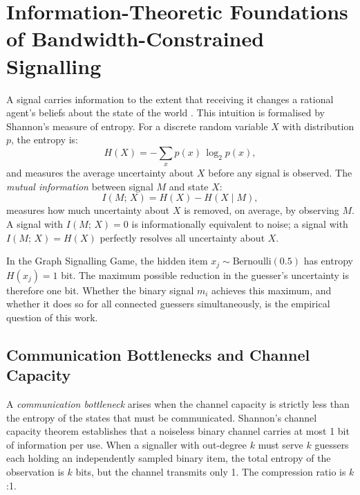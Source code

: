 \documentclass[a4paper,twoside,12pt]{report}
\begin{document}
    \section*{Information-Theoretic Foundations of Bandwidth-Constrained Signalling}
    \label{sec:signalling-theory}
    
    A signal carries information to the extent that receiving it changes a
    rational agent's beliefs about the state of the world
    \citep{skyrms2010}. This intuition is formalised by Shannon's measure of
    entropy. For a discrete random variable $X$ with distribution $p$, the
    entropy is:
    \begin{equation}
        H(X) = -\sum_{x} p(x)\,\log_2 p(x),
    \end{equation}
    and measures the average uncertainty about $X$ before any signal is
    observed. The \emph{mutual information} between signal $M$ and state $X$:
    \begin{equation}
        I(M;\,X) = H(X) - H(X \mid M),
    \end{equation}
    measures how much uncertainty about $X$ is removed, on average, by
    observing $M$. A signal with $I(M;\,X) = 0$ is informationally
    equivalent to noise; a signal with $I(M;\,X) = H(X)$ perfectly resolves
    all uncertainty about $X$.
    
    In the Graph Signalling Game, the hidden item $x_j \sim
    \mathrm{Bernoulli}(0.5)$ has entropy $H(x_j) = 1$ bit. The maximum
    possible reduction in the guesser's uncertainty is therefore one bit.
    Whether the binary signal $m_i$ achieves this maximum, and whether it
    does so for all connected guessers simultaneously, is the empirical
    question of this work.
    
    \subsection*{Communication Bottlenecks and Channel Capacity}
    
    A \emph{communication bottleneck} arises when the channel capacity is
    strictly less than the entropy of the states that must be communicated.
    Shannon's channel capacity theorem establishes that a noiseless binary
    channel carries at most 1 bit of information per use. When a signaller with out-degree $k$ must serve $k$
    guessers each holding an independently sampled binary item, the total
    entropy of the observation is $k$ bits, but the channel transmits only
    1. The compression ratio is $k$:1.
    
\end{document}
